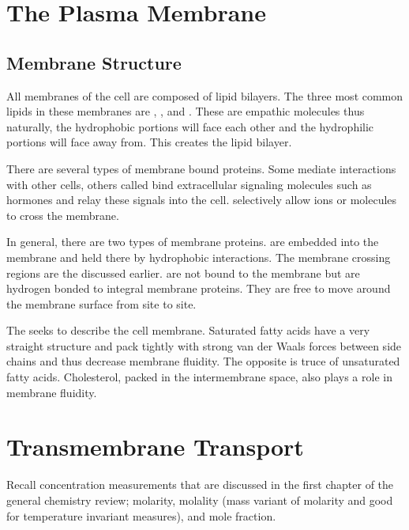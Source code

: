\documentclass[../Bio_chemistryReview.tex]{subfiles}
\begin{document}
\section{The Plasma Membrane}
\subsection{Membrane Structure}
All membranes of the cell are composed of lipid bilayers. The three most common
lipids in these membranes are , ,
and . These are empathic molecules thus naturally, the
hydrophobic portions will face each other and the hydrophilic portions will face
away from. This creates the lipid bilayer.\par

There are several types of membrane bound proteins. Some mediate interactions
with other cells, others called  bind
extracellular signaling molecules such as hormones and relay these signals into
the cell.  selectively allow ions or molecules to
cross the membrane.\par

In general, there are two types of membrane proteins.  are embedded into the membrane and held there by hydrophobic
interactions. The membrane crossing regions are the  discussed earlier.  are not bound
to the membrane but are hydrogen bonded to integral membrane proteins. They are
free to move around the membrane surface from site to site.\par

The  seeks to describe the cell membrane. Saturated
fatty acids have a very straight structure and pack tightly with strong van der
Waals forces between side chains and thus decrease membrane fluidity. The
opposite is truce of unsaturated fatty acids. Cholesterol, packed in the
intermembrane space, also plays a role in membrane fluidity.

\section{Transmembrane Transport}
Recall concentration measurements that are discussed in the first chapter of the
general chemistry review; molarity, molality (mass variant of molarity and good
for temperature invariant measures), and mole fraction.
\end{document}
